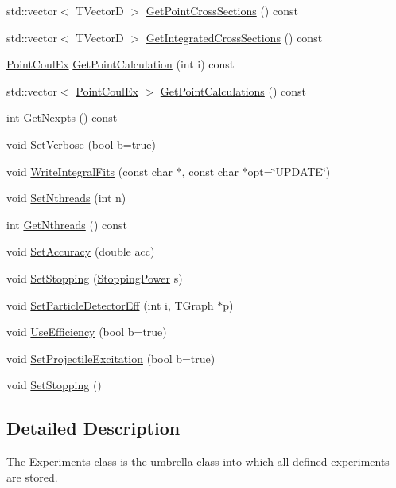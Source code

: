 \begin{DoxyCompactItemize}
\item 
std\-::vector$<$ T\-Vector\-D $>$ \hyperlink{classExperiments_a536e796fba4df63d62c9f3277f910a73}{Get\-Point\-Cross\-Sections} () const 
\item 
std\-::vector$<$ T\-Vector\-D $>$ \hyperlink{classExperiments_a47a82e8b042491288d6b900ad9198c35}{Get\-Integrated\-Cross\-Sections} () const 
\item 
\hyperlink{classPointCoulEx}{Point\-Coul\-Ex} \hyperlink{classExperiments_ad4c9c3bcb227b9982d52654e28dab360}{Get\-Point\-Calculation} (int i) const 
\item 
std\-::vector$<$ \hyperlink{classPointCoulEx}{Point\-Coul\-Ex} $>$ \hyperlink{classExperiments_aed971cdffd3863f01d1246b3810ad190}{Get\-Point\-Calculations} () const 
\item 
int \hyperlink{classExperiments_a6e6df0546be0608c2ff936f7bbf3a0bb}{Get\-Nexpts} () const 
\item 
void \hyperlink{classExperiments_a5bc069b7d1388ed1aac87600bff18b43}{Set\-Verbose} (bool b=true)
\item 
void \hyperlink{classExperiments_add6a2b8636244411a03515f396b3603d}{Write\-Integral\-Fits} (const char $\ast$, const char $\ast$opt=\char`\"{}U\-P\-D\-A\-T\-E\char`\"{})
\item 
void \hyperlink{classExperiments_ac8f99d06ff63f2e0fda80ad647edd3b6}{Set\-Nthreads} (int n)
\item 
int \hyperlink{classExperiments_a0b5789577937188a891a2c5e70b3c8e6}{Get\-Nthreads} () const 
\item 
void \hyperlink{classExperiments_a8aa4eb6fa6131902a90a4c602bb055f7}{Set\-Accuracy} (double acc)
\item 
void \hyperlink{classExperiments_a777e9756290797247971042c4e64ed9e}{Set\-Stopping} (\hyperlink{classStoppingPower}{Stopping\-Power} s)
\item 
void \hyperlink{classExperiments_ac3ecd5d912831599b4b4a2ae290a012e}{Set\-Particle\-Detector\-Eff} (int i, T\-Graph $\ast$p)
\item 
void \hyperlink{classExperiments_a7902dd87eee8cf24ded441ba889f97fb}{Use\-Efficiency} (bool b=true)
\item 
void \hyperlink{classExperiments_a2766ab644312a272bde08e4abfa02c18}{Set\-Projectile\-Excitation} (bool b=true)
\item 
void \hyperlink{classExperiments_a9be7f0d32798b9d3bd747b64bfde10bf}{Set\-Stopping} ()
\end{DoxyCompactItemize}


\subsection{Detailed Description}
The \hyperlink{classExperiments}{Experiments} class is the umbrella class into which all defined experiments are stored. 

